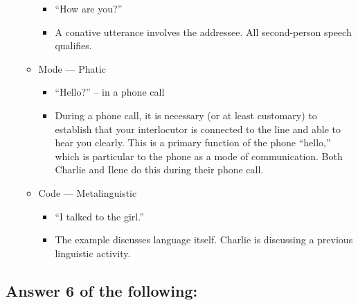 \documentclass[man,12pt]{apa6}
\providecommand{\tightlist}{%
  \setlength{\itemsep}{0pt}\setlength{\parskip}{0pt}}
\begin{document}
\begin{enumerate}
\begin{itemize}
    \begin{itemize}
    \tightlist
    \item
      ``How are you?''
    \item
      A conative utterance involves the addressee. All second-person
      speech qualifies.
    \end{itemize}
  \item
    Mode --- Phatic

    \begin{itemize}
    \tightlist
    \item
      ``Hello?'' -- in a phone call
    \item
      During a phone call, it is necessary (or at least customary) to
      establish that your interlocutor is connected to the line and able
      to hear you clearly. This is a primary function of the phone
      ``hello,'' which is particular to the phone as a mode of
      communication. Both Charlie and Ilene do this during their phone
      call.
    \end{itemize}
  \item
    Code --- Metalinguistic

    \begin{itemize}
    \tightlist
    \item
      ``I talked to the girl.''
    \item
      The example discusses language itself. Charlie is discussing a
      previous linguistic activity.
    \end{itemize}
  \end{itemize}
\end{enumerate}

\subsection{Answer 6 of the following:}\label{answer-6-of-the-following}
\end{document}
